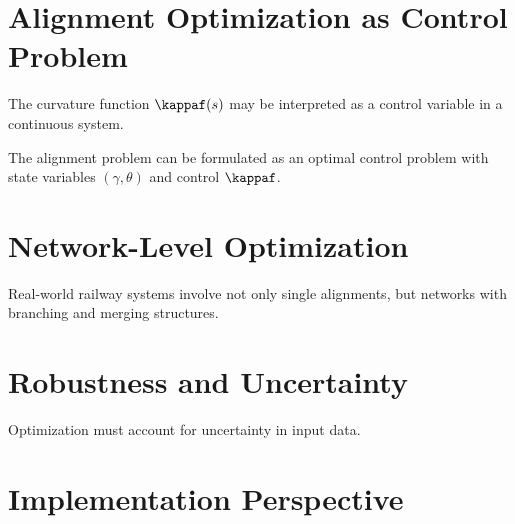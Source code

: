 

\section{Alignment Optimization as Control Problem}

\begin{remark}
The curvature function $\kappaf(s)$ may be interpreted as a control
variable in a continuous system.
\end{remark}

\begin{definition}
The alignment problem can be formulated as an optimal control problem
with state variables $(\gamma,\theta)$ and control $\kappaf$.
\end{definition}


\section{Network-Level Optimization}

\begin{remark}
Real-world railway systems involve not only single alignments, but
networks with branching and merging structures.
\end{remark}



\section{Robustness and Uncertainty}

\begin{remark}
Optimization must account for uncertainty in input data.
\end{remark}



\section{Implementation Perspective}

